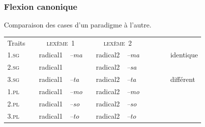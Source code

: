 \begin{frame}
\frametitle{Flexion canonique}
Comparaison des cases d'un paradigme à l'autre.

\scriptsize

\begin{table}
\begin{tabular}{|l| p{1mm}|ll|p{1mm}|ll|p{1mm}cl}
\cline{1-1}\cline{3-4}\cline{6-7}
Traits&&\multicolumn{2}{|c|}{\cellcolor{white}\textsc{ lexème~1}}&&\multicolumn{2}{|c|}{\cellcolor{white}\textsc{ lexème~2}}&&\\
\cline{1-1}\cline{3-4}\cline{6-7}
\textsc{1.sg}&& \cellcolor{mandarine}radical1& {\em --ma}&&\cellcolor{mandarine}radical2& {\em
  --ma}&&\cellcolor{ciel}~~~&identique\\
\cline{1-1}\cline{3-4}\cline{6-7}
\textsc{2.sg}& &radical1&\cellcolor{ciel}{\em --sa}&&radical2&\cellcolor{ciel} {\em --sa}&&&\\
\cline{1-1}\cline{3-4}\cline{6-7}
\textsc{3.sg}&& radical1&{\em --ta}&&radical2& {\em
  --ta}&&\cellcolor{mandarine}&différent\\
\cline{1-1}\cline{3-4}\cline{6-7}
\textsc{1.pl}&&radical1& {\em --mo}&&radical2& {\em --mo}&&\\
\cline{1-1}\cline{3-4}\cline{6-7}
\textsc{2.pl}&&radical1& {\em --so}&&radical2& {\em --so}&&\\
\cline{1-1}\cline{3-4}\cline{6-7}
\textsc{3.pl}&&radical1& {\em --to}&&radical2& {\em --to}&&\\
\cline{1-1}\cline{3-4}\cline{6-7}
\end{tabular}\\[1mm]
\end{table}
\end{frame}


